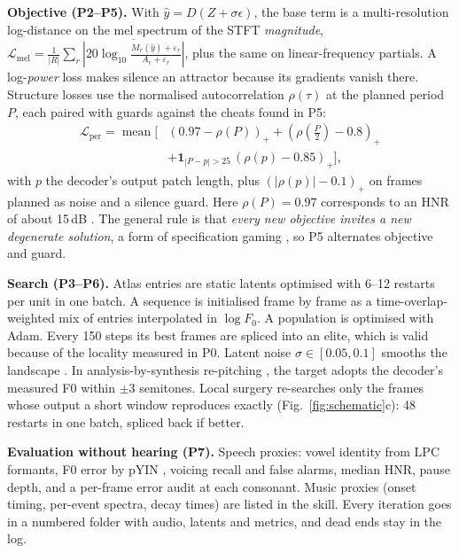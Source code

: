\documentclass[10pt,twocolumn]{article}
\renewcommand{\paragraph}[1]{\smallskip\noindent\textbf{#1}\;}
\begin{document}
\paragraph{Objective (P2--P5).} With $\hat y=D(Z+\sigma\epsilon)$, the base term is a multi-resolution \cite{yamamoto2020parallel} log-distance on the mel spectrum of the STFT \emph{magnitude}, $\mathcal{L}_{\text{mel}}=\frac{1}{|R|}\sum_r\overline{|20\log_{10}\frac{M_r(\hat y)+\varepsilon_r}{A_r+\varepsilon_r}|}$, plus the same on linear-frequency partials. A log-\emph{power} loss makes silence an attractor because its gradients vanish there. Structure losses use the normalised autocorrelation $\rho(\tau)$ at the planned period $P$, each paired with guards against the cheats found in P5:
\begin{align}
\mathcal{L}_{\text{per}}=\operatorname{mean}\big[&(0.97-\rho(P))_+ + (\rho(\tfrac{P}{2})-0.8)_+ \nonumber\\
&+\mathbf{1}_{|P-p|>25}\,(\rho(p)-0.85)_+\big],
\end{align}
with $p$ the decoder's output patch length, plus $(|\rho(p)|-0.1)_+$ on frames planned as noise and a silence guard. Here $\rho(P)=0.97$ corresponds to an HNR of about 15\,dB \cite{boersma1993accurate}. The general rule is that \emph{every new objective invites a new degenerate solution}, a form of specification gaming \cite{krakovna2020specification}, so P5 alternates objective and guard.

\paragraph{Search (P3--P6).} Atlas entries are static latents optimised with 6--12 restarts per unit in one batch. A sequence is initialised frame by frame as a time-overlap-weighted mix of entries interpolated in $\log F_0$. A population is optimised with Adam. Every 150 steps its best frames are spliced into an elite, which is valid because of the locality measured in P0. Latent noise $\sigma\in[0.05,0.1]$ smooths the landscape \cite{cohen2019certified}. In analysis-by-synthesis re-pitching \cite{bell1961reduction}, the target adopts the decoder's measured F0 within $\pm$3 semitones. Local surgery re-searches only the frames whose output a short window reproduces exactly (Fig.~\ref{fig:schematic}c): 48 restarts in one batch, spliced back if better.

\paragraph{Evaluation without hearing (P7).} Speech proxies: vowel identity from LPC formants, F0 error by pYIN \cite{mauch2014pyin}, voicing recall and false alarms, median HNR, pause depth, and a per-frame error audit at each consonant. Music proxies (onset timing, per-event spectra, decay times) are listed in the skill. Every iteration goes in a numbered folder with audio, latents and metrics, and dead ends stay in the log.
\end{document}
